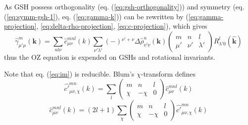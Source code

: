 As GSH possess orthogonality (eq. (\ref{eq:gsh-orthogonality})) and
symmetry (eq. (\ref{eq:symm-gsh-1}), eq. (\ref{eq:gamma-k})) can be
rewritten by (\ref{eq:gamma-projection}, \ref{eq:delta-rho-projection},
\ref{eq:c-projection}), which gives
\begin{equation}
\hat{\gamma}_{\mu'\mu}^{m}(\mathbf{k})=\sum_{nl\nu}\hat{c}_{\mu\nu}^{mnl}(k)\sum_{\nu'\lambda'}\left(-\right){}^{\nu'+\nu}\Delta\hat{\rho}_{\underline{\nu'}\underline{\nu}}^{n}(\mathbf{k})\left(\begin{array}{ccc}
m & n & l\\
\mu' & \nu' & \lambda'
\end{array}\right)R_{\lambda'0}^{l}(\hat{\mathbf{k}})\label{eq:im}
\end{equation}
thus the OZ equation is expended on GSHs and rotational invariants. %

Note that eq. (\ref{eq:im}) is reducible. Blum's
$\chi$-transform defines\citep{Blum_II} 
\begin{equation}
\hat{c'}_{\mu\nu,\chi}^{mn}(k)=\sum_{l}\left(\begin{array}{ccc}
m & n & l\\
\chi & -\chi & 0
\end{array}\right)\hat{c}_{\mu\nu}^{mnl}(k)
\end{equation}
\begin{equation}
\hat{c}_{\mu\nu}^{mnl}(k)=\left(2l+1\right)\sum_{\chi}\left(\begin{array}{ccc}
m & n & l\\
\chi & -\chi & 0
\end{array}\right)\hat{c'}_{\mu\nu,\chi}^{mn}(k)\label{eq:c-p}
\end{equation}


